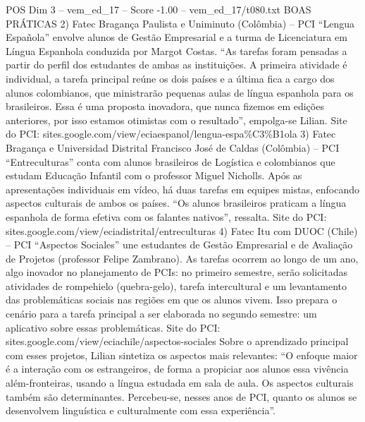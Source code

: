 \begin{textsample}{POS Dim 3 – vem\_ed\_17 – Score -1.00 – vem\_ed\_17/t080.txt}  \label{ex:f3_pos_066}
BOAS PRÁTICAS 2) Fatec Bragança Paulista e Uniminuto (Colômbia) – PCI “Lengua Española” envolve alunos de Gestão Empresarial e a turma de Licenciatura em Língua Espanhola conduzida por Margot Costas. “As tarefas foram pensadas a partir do perfil dos estudantes de ambas as instituições.
A primeira atividade é individual, a tarefa principal reúne os dois países e a última fica a cargo dos alunos colombianos, que ministrarão pequenas aulas de língua espanhola para os brasileiros.
Essa é uma proposta inovadora, que nunca fizemos em edições anteriores, por isso estamos otimistas com o resultado”, empolga-se Lilian.
Site do PCI: sites.google.com/view/eciaespanol/lengua-espa\%C3\%B1ola 3) Fatec Bragança e Universidad Distrital Francisco José de Caldas (Colômbia) – PCI “Entreculturas” conta com alunos brasileiros de Logística e colombianos que estudam Educação Infantil com o professor Miguel Nicholls.
Após as apresentações individuais em vídeo, há duas tarefas em equipes mistas, enfocando aspectos culturais de ambos os países. “Os alunos brasileiros praticam a língua espanhola de forma efetiva com os falantes nativos”, ressalta.
Site do PCI: sites.google.com/view/eciadistrital/entreculturas 4) Fatec Itu com DUOC (Chile) – PCI “Aspectos Sociales” une estudantes de Gestão Empresarial e de Avaliação de Projetos (professor Felipe Zambrano).
As tarefas ocorrem ao longo de um ano, algo inovador no planejamento de PCIs: no primeiro semestre, serão solicitadas atividades de rompehielo (quebra-gelo), tarefa intercultural e um levantamento das problemáticas sociais nas regiões em que os alunos vivem.
Isso prepara o cenário para a tarefa principal a ser elaborada no segundo semestre: um aplicativo sobre essas problemáticas.
Site do PCI: sites.google.com/view/eciachile/aspectos-sociales Sobre o aprendizado principal com esses projetos, Lilian sintetiza os aspectos mais relevantes: “O enfoque maior é a interação com os estrangeiros, de forma a propiciar aos alunos essa vivência além-fronteiras, usando a língua estudada em sala de aula.
Os aspectos culturais também são determinantes.
Percebeu-se, nesses anos de PCI, quanto os alunos se desenvolvem linguística e culturalmente com essa experiência”.

\end{textsample}
